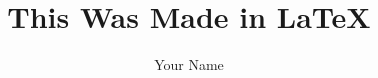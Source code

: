 \documentclass[final]{beamer}
\title{This Was Made in \LaTeX}
\author{Your Name}
\institute{Department and University Name}
\begin{document}
\begin{frame}[t]

\end{frame}
\end{document}
